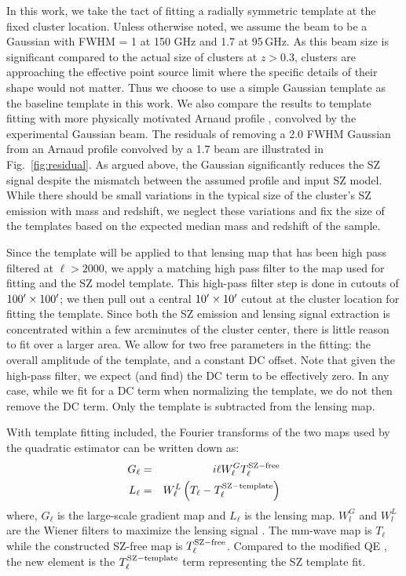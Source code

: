 {In this work, we take the tact of fitting a radially symmetric template at the fixed cluster location. 
Unless otherwise noted, we assume the beam to be a Gaussian with FWHM = 1\arcmin{} at 150 GHz and 1\arcmin.7 at 95\,GHz. 
As this beam size is significant compared to the actual size of clusters at $z>0.3$, clusters are approaching the effective point source limit where the specific details of their shape would not matter. 
Thus we choose to use a simple Gaussian template as the baseline template in this work. 
We also compare the results to template fitting with more physically motivated Arnaud profile \citep{arnaud10}, convolved by the experimental Gaussian beam.  
The residuals of removing a 2\arcmin.0 FWHM Gaussian from an Arnaud profile convolved by a 1\arcmin.7 beam are illustrated in Fig.~\ref{fig:residual}. 
As argued above, the Gaussian significantly reduces the SZ signal despite the mismatch between the assumed profile and input SZ model. 
While there should be small variations in the typical size of the cluster's SZ emission with mass and redshift, we neglect these variations and fix the size of the templates based on the expected median mass and redshift of the sample.

Since the template will be applied to that lensing map that has been high pass filtered at $\ell > 2000$, we apply a matching high pass filter to the map used for fitting and the SZ model template. 
This high-pass filter step is done in cutouts of $100^{\prime} \times 100^{\prime}$; we then pull out a central $10^{\prime} \times 10^{\prime}$ cutout at the cluster location for fitting the template. 
Since both the SZ emission and lensing signal extraction is concentrated within a few arcminutes of the cluster center, there is little reason to fit over a larger area. 
We allow for two free parameters in the fitting: the overall amplitude of the template, and a constant DC offset. 
Note that given the high-pass filter, we expect (and find) the DC term to be effectively zero. 
In any case, while we fit for a DC term when normalizing the template, we do not then remove the DC term. 
Only the template is subtracted from the lensing map.

With template fitting included, the Fourier transforms of the two maps used by the quadratic estimator can be written down as:
\begin{eqnarray}
G_{\ell} &=& i\ell W^{G}_{\ell} T^{\rm SZ-free}_{\ell}\\
L_{\ell} &=& W^{L}_{\ell} \left(T_{\ell} - T_\ell^{\rm SZ-template}\right)
\end{eqnarray}
where, $G_{\ell}$ is the large-scale gradient map and $L_{\ell}$ is the lensing map. 
$W^{G}_{l}$ and $W^{L}_{l} $ are the Wiener filters to maximize the lensing signal \cite{hu06}. 
The mm-wave map is $T_{\ell}$ while the constructed SZ-free map is $T^{\rm SZ-free}_{\ell}$. 
Compared to the modified QE \citep{madhavacheril15,raghunathan18}, the new element is the $T_\ell^{\rm SZ-template}$ term representing the SZ template fit. 

}
